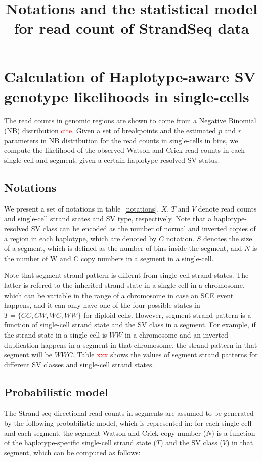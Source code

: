 \documentclass[12pt]{article}
\title{Notations and the statistical model for read count of StrandSeq data}
\newcommand{\X}{X} %
\newcommand{\T}{T} %
\newcommand{\V}{V} %
\begin{document}
\maketitle

\section{Calculation of Haplotype-aware SV genotype likelihoods in single-cells}

The read counts in genomic regions are shown to come from a Negative Binomial (NB) distribution \textcolor{red}{cite}.%
Given a set of breakpoints and the estimated $p$ and $r$ parameters in NB distribution for the read counts in single-cells in bins, we compute the likelihood of the observed Watson and Crick read counts in each single-cell and segment, given a certain haplotype-resolved SV status.

\subsection{Notations}
We present a set of notations in table~\ref{notations}. $\X$, $\T$ and $\V$ denote read counts and single-cell strand states and SV type, respectively.
Note that a haplotype-resolved SV class can be encoded as the number of normal and inverted copies of a region in each haplotype, which are denoted by $C$ notation.
$S$ denotes the size of a segment, which is defined as the number of bins inside the segment, and $N$ is the number of W and C copy numbers in a segment in a single-cell.

Note that segment strand pattern is differnt from single-cell strand states.
The latter is refered to the inherited strand-state in a single-cell in a chromosome, which can be variable in the range of a chromosome in case an SCE event happens, and it can only have one of the four possible states in $\T = \{CC,CW,WC,WW\}$ for diploid cells.
However, segment strand pattern is a function of single-cell strand state and the SV class in a segment.
For example, if the strand state in a single-cell is $WW$ in a chromosome and an inverted duplication happens in a segment in that chromosome, the strand pattern in that segment will be $WWC$.
Table \textcolor{red}{xxx} shows the values of segment strand patterns for different SV classes and single-cell strand states.

\subsection{Probabilistic model}
The Strand-seq directional read counts in segments are assumed to be generated by the following probabilistic model, which is represented in:
for each single-cell and each segment, the segment Watson and Crick copy number ($N$) is a function of the haplotype-specific single-cell strand state ($T$) and the SV class ($V$) in that segment, which can be computed as follows:
\end{document}
